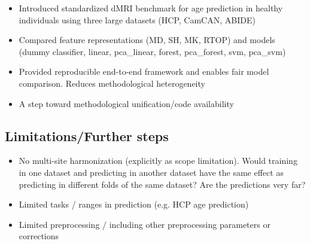 \begin{itemize}
    \item Introduced standardized dMRI benchmark for age prediction in healthy individuals using three large datasets (HCP, CamCAN, ABIDE) 
    \item Compared feature representations (MD, SH, MK, RTOP) and models (dummy classifier, linear, pca\_linear, forest, pca\_forest, svm, pca\_svm)
    \item Provided reproducible end{-}to{-}end framework and enables fair model comparison. Reduces methodological heterogeneity
    \item A step toward methodological unification/code availability
\end{itemize}

\subsection{Limitations/Further steps}
\begin{itemize}
    \item No multi-site harmonization (explicitly as scope limitation). Would training in one dataset and predicting in another dataset have the same effect as predicting in different folds of the same dataset? Are the predictions very far?
    \item Limited tasks / ranges in prediction (e.g. HCP age prediction)
    \item Limited preprocessing / including other preprocessing parameters or corrections
\end{itemize}